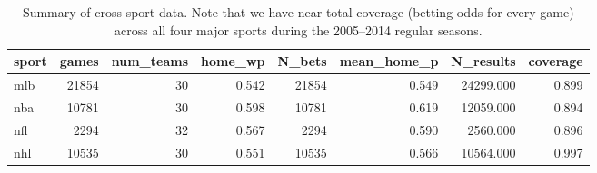 \documentclass{beamer}\usepackage[]{graphicx}\usepackage[]{color}
\begin{document}


\begin{frame}[fragile]
\tiny
\begin{table}[ht]
\centering
\begin{tabular}{lrrrrrrr}
  \hline
sport & games & num\_teams & home\_wp & N\_bets & mean\_home\_p & N\_results & coverage \\ 
  \hline
mlb & 21854 &   30 & 0.542 & 21854 & 0.549 & 24299.000 & 0.899 \\ 
  nba & 10781 &   30 & 0.598 & 10781 & 0.619 & 12059.000 & 0.894 \\ 
  nfl & 2294 &   32 & 0.567 & 2294 & 0.590 & 2560.000 & 0.896 \\ 
  nhl & 10535 &   30 & 0.551 & 10535 & 0.566 & 10564.000 & 0.997 \\ 
   \hline
\end{tabular}
\caption{Summary of cross-sport data. Note that we have near total coverage (betting odds for every game) across all four major sports during the 2005--2014 regular seasons.} 
\label{tab:bigfour}
\end{table}

\end{frame}
\end{document}
